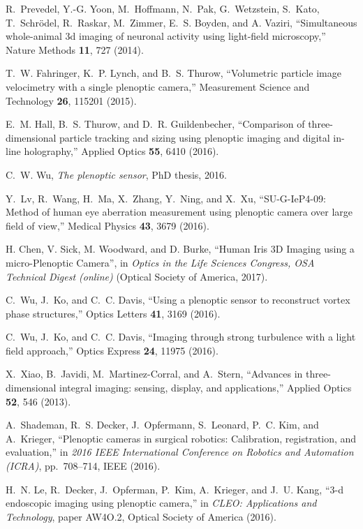 \documentclass[aps,pra,amssymb,twocolumn,amsmath,superscriptaddress,showpacs,10pt]{revtex4-1}
\begin{document}
\begin{thebibliography}{10}
R.~Prevedel, Y.-G. Yoon, M.~Hoffmann, N.~Pak, G.~Wetzstein, S.~Kato, T.~Schr{\"o}del, R.~Raskar, M.~Zimmer, E.~S. Boyden, and A. Vaziri, ``Simultaneous whole-animal 3d imaging of neuronal activity using light-field microscopy,'' Nature Methods \textbf{11}, 727 (2014).

T.~W. Fahringer, K.~P. Lynch, and B.~S. Thurow, ``Volumetric particle image velocimetry with a single plenoptic camera,'' Measurement Science and Technology \textbf{26}, 115201 (2015).

E.~M. Hall, B.~S. Thurow, and D.~R. Guildenbecher, ``Comparison of three-dimensional particle tracking and sizing using plenoptic imaging and digital in-line holography,'' Applied Optics \textbf{55}, 6410 (2016).

C.~W. Wu, {\em The plenoptic sensor}, PhD thesis, 2016.

Y.~Lv, R.~Wang, H.~Ma, X.~Zhang, Y.~Ning, and X.~Xu, ``SU-G-IeP4-09: Method of human eye aberration measurement using plenoptic camera over large field of view,'' Medical Physics \textbf{43}, 3679 (2016).

H. Chen, V. Sick, M. Woodward, and D. Burke, ``Human Iris 3D Imaging using a micro-Plenoptic Camera'', in \textit{Optics in the Life Sciences Congress, OSA Technical Digest (online)} (Optical Society of America, 2017).

C.~Wu, J.~Ko, and C.~C. Davis, ``Using a plenoptic sensor to reconstruct vortex phase structures,'' Optics Letters \textbf{41}, 3169 (2016).

C.~Wu, J.~Ko, and C.~C. Davis, ``Imaging through strong turbulence with a light field approach,'' Optics Express \textbf{24}, 11975 (2016).

X.~Xiao, B.~Javidi, M.~Martinez-Corral, and A.~Stern, ``Advances in three-dimensional integral imaging: sensing, display, and applications,'' Applied Optics \textbf{52}, 546 (2013).

A.~Shademan, R.~S. Decker, J.~Opfermann, S.~Leonard, P.~C. Kim, and A.~Krieger, ``Plenoptic cameras in surgical robotics: Calibration, registration, and evaluation,'' in {\em 2016 IEEE International Conference on Robotics and Automation (ICRA)}, pp.~708--714, IEEE (2016).

H.~N. Le, R.~Decker, J.~Opferman, P.~Kim, A.~Krieger, and J.~U. Kang, ``3-d endoscopic imaging using plenoptic camera,'' in {\em CLEO: Applications and Technology}, paper AW4O.2, Optical Society of America (2016).


\end{thebibliography}
\end{document}
